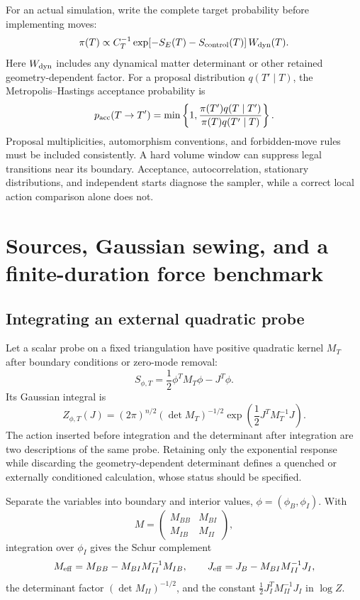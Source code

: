 For an actual simulation, write the complete target probability before implementing moves:
\begin{equation}
\pi(T)\propto C_T^{-1}
\exp[-S_E(T)-S_{\rm control}(T)]\,W_{\rm dyn}(T).
\end{equation}
Here $W_{\rm dyn}$ includes any dynamical matter determinant or other retained geometry-dependent factor. For a proposal distribution $q(T'\mid T)$, the Metropolis--Hastings acceptance probability is
\begin{equation}
p_{\rm acc}(T\to T')=
\min\left\{1,\frac{\pi(T')q(T\mid T')}{\pi(T)q(T'\mid T)}\right\}.
\end{equation}
Proposal multiplicities, automorphism conventions, and forbidden-move rules must be included consistently. A hard volume window can suppress legal transitions near its boundary. Acceptance, autocorrelation, stationary distributions, and independent starts diagnose the sampler, while a correct local action comparison alone does not.

\section{Sources, Gaussian sewing, and a finite-duration force benchmark}
\label{app:sources}

\subsection{Integrating an external quadratic probe}

Let a scalar probe on a fixed triangulation have positive quadratic kernel $M_T$ after boundary conditions or zero-mode removal:
\begin{equation}
S_{\phi,T}=\frac12\phi^TM_T\phi-J^T\phi.
\end{equation}
Its Gaussian integral is
\begin{equation}
Z_{\phi,T}(J)=(2\pi)^{n/2}(\det M_T)^{-1/2}
\exp\left(\frac12J^TM_T^{-1}J\right).
\label{eq:gaussianprobe}
\end{equation}
The action inserted before integration and the determinant after integration are two descriptions of the same probe. Retaining only the exponential response while discarding the geometry-dependent determinant defines a quenched or externally conditioned calculation, whose status should be specified.

Separate the variables into boundary and interior values, $\phi=(\phi_B,\phi_I)$. With
\begin{equation}
M=
\begin{pmatrix}
M_{BB}&M_{BI}\\
M_{IB}&M_{II}
\end{pmatrix},
\end{equation}
integration over $\phi_I$ gives the Schur complement
\begin{equation}
M_{\rm eff}=M_{BB}-M_{BI}M_{II}^{-1}M_{IB},
\qquad
J_{\rm eff}=J_B-M_{BI}M_{II}^{-1}J_I,
\end{equation}
the determinant factor $(\det M_{II})^{-1/2}$, and the constant
$\tfrac12J_I^TM_{II}^{-1}J_I$ in $\log Z$.

